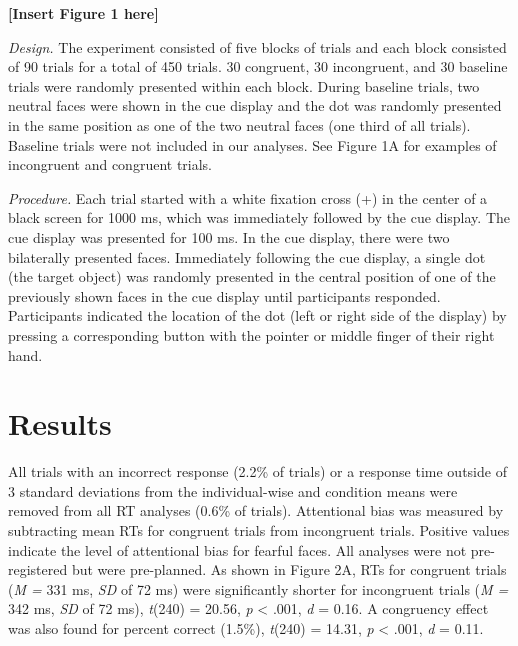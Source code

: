 \documentclass{article}
\begin{document}
\textbf{[Insert Figure 1 here]}

\emph{Design. }The experiment consisted of five blocks of trials and each block consisted of 90 trials for a total of 450 trials. 30 congruent, 30 incongruent, and 30 baseline trials were randomly presented within each block. During baseline trials, two neutral faces were shown in the cue display and the dot was randomly presented in the same position as one of the two neutral faces (one third of all trials). Baseline trials were not included in our analyses. See Figure 1A for examples of incongruent and congruent trials.

\emph{Procedure. }Each trial started with a white fixation cross (+) in the center of a black screen for 1000 ms, which was immediately followed by the cue display. The cue display was presented for 100 ms. In the cue display, there were two bilaterally presented faces. Immediately following the cue display, a single dot (the target object) was randomly presented in the central position of one of the previously shown faces in the cue display until participants responded. Participants indicated the location of the dot (left or right side of the display) by pressing a corresponding button with the pointer or middle finger of their right hand.

\section{Results}

All trials with an incorrect response (2.2\% of trials) or a response time outside of 3 standard deviations from the individual-wise and condition means were removed from all RT analyses (0.6\% of trials). Attentional bias was measured by subtracting mean RTs for congruent trials from incongruent trials. Positive values indicate the level of attentional bias for fearful faces. All analyses were not pre-registered but were pre-planned. As shown in Figure 2A, RTs for congruent trials (\emph{M = }331 ms, \emph{SD} of 72 ms) were significantly shorter for incongruent trials (\emph{M = }342 ms, \emph{SD} of 72 ms), \emph{t}(240) = 20.56, \emph{p} < .001, \emph{d }= 0.16. A congruency effect was also found for percent correct (1.5\%), \emph{t}(240) = 14.31, \emph{p} < .001, \emph{d }= 0.11.
\end{document}
